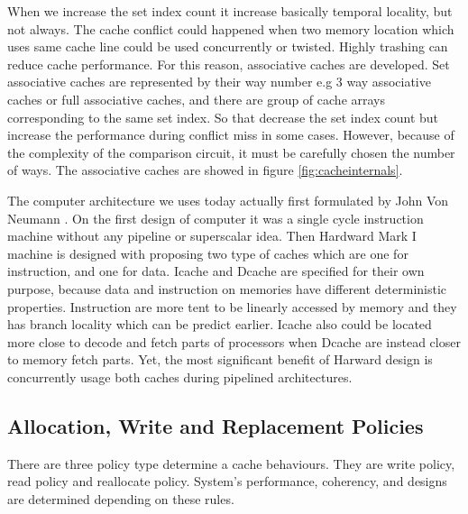     When we increase the set index count it increase basically temporal locality, but not always. The cache conflict could happened when two memory location which uses same cache line could be used concurrently or twisted. Highly trashing can reduce cache performance. For this reason, associative caches are developed. Set associative caches are represented by their way number e.g 3 way associative caches or full associative caches, and there are group of cache arrays corresponding to the same set index. So that decrease the set index count but increase the performance during conflict miss in some cases. However, because of the complexity of the comparison circuit, it must be carefully chosen the number of ways. The associative caches are showed in figure \ref{fig:cacheinternals}. 

    The computer architecture we uses today actually first formulated by John Von Neumann  \cite{von1961collected}. On the first design of computer it was a single cycle instruction machine without any pipeline or superscalar idea. Then Hardward Mark I machine is designed with proposing two type of caches which are one for instruction, and one for data. Icache and Dcache are specified for their own purpose, because data and instruction on memories have different deterministic properties. Instruction are more tent to be linearly accessed by memory and they has branch locality which can be predict earlier. Icache also could be located more close to decode and fetch parts of processors when Dcache are instead closer to memory fetch parts. Yet, the most significant benefit of Harward design is concurrently usage both caches during pipelined architectures. 
    \subsection{Allocation, Write and Replacement Policies}
    There are three policy type determine a cache behaviours. They are write policy, read policy and reallocate policy. System's performance, coherency, and designs are determined depending on these rules. 

